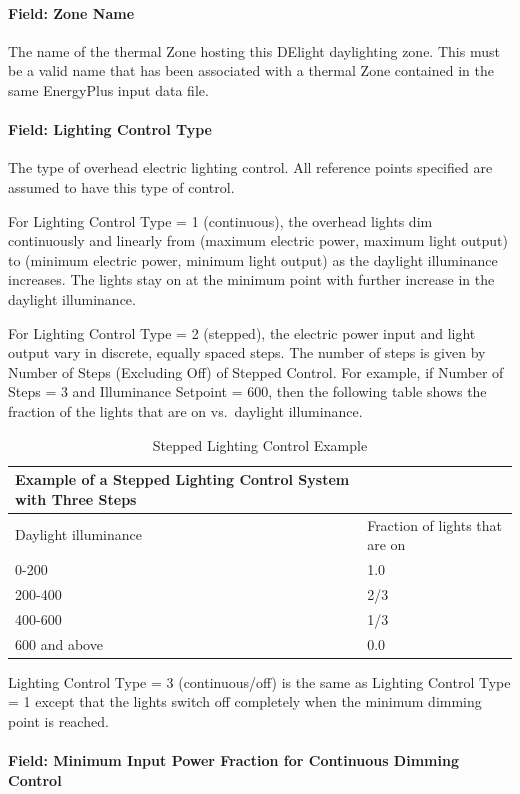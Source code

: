 \paragraph{Field: Zone Name}\label{field-zone-name-1-002}

The name of the thermal Zone hosting this DElight daylighting zone. This must be a valid name that has been associated with a thermal Zone contained in the same EnergyPlus input data file.

\paragraph{Field: Lighting Control Type}\label{field-lighting-control-type-1}

The type of overhead electric lighting control. All reference points specified are assumed to have this type of control.

For Lighting Control Type = 1 (continuous), the overhead lights dim continuously and linearly from (maximum electric power, maximum light output) to (minimum electric power, minimum light output) as the daylight illuminance increases. The lights stay on at the minimum point with further increase in the daylight illuminance.

For Lighting Control Type = 2 (stepped), the electric power input and light output vary in discrete, equally spaced steps. The number of steps is given by Number of Steps (Excluding Off) of Stepped Control. For example, if Number of Steps = 3 and Illuminance Setpoint = 600, then the following table shows the fraction of the lights that are on vs.~daylight illuminance.

\begin{longtable}[c]{p{4.01in}p{1.97in}}
\caption{Stepped Lighting Control Example \protect \label{table:stepped-lighting-control-example-001}}\\
\toprule 
Example of a Stepped Lighting Control System with Three Steps \tabularnewline \midrule
\endhead
Daylight illuminance & Fraction of lights that are on \tabularnewline
0-200 & 1.0 \tabularnewline
200-400 & 2/3 \tabularnewline
400-600 & 1/3 \tabularnewline
600 and above & 0.0 \tabularnewline
\bottomrule
\end{longtable}

Lighting Control Type = 3 (continuous/off) is the same as Lighting Control Type = 1 except that the lights switch off completely when the minimum dimming point is reached.

\paragraph{Field: Minimum Input Power Fraction for Continuous Dimming Control}\label{field-minimum-input-power-fraction-for-continuous-dimming-control-1}

